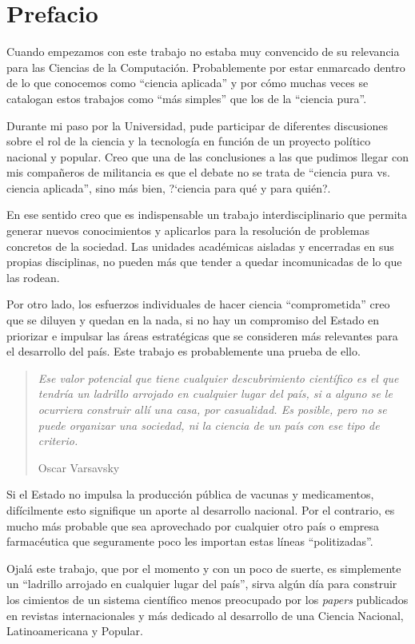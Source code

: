\chapter*{Prefacio}

Cuando empezamos con este trabajo no estaba muy convencido de su relevancia
para las Ciencias de la Computaci\'on. Probablemente por estar enmarcado dentro
de lo que conocemos como ``ciencia aplicada'' y por c\'omo muchas veces se
catalogan estos trabajos como ``m\'as simples'' que los de la ``ciencia pura''.

Durante mi paso por la Universidad, pude participar de diferentes discusiones
sobre el rol de la ciencia y la tecnolog\'ia en funci\'on de un proyecto
pol\'itico nacional y popular. Creo que una de las conclusiones a las que
pudimos llegar con mis compa\~neros de militancia es que el debate no se trata
de ``ciencia pura vs. ciencia aplicada'', sino m\'as bien, ?`ciencia para qu\'e
y para qui\'en?.

En ese sentido creo que es indispensable un trabajo interdisciplinario que
permita generar nuevos conocimientos y aplicarlos para la resoluci\'on de
problemas concretos de la sociedad. Las unidades acad\'emicas aisladas y
encerradas en sus propias disciplinas, no pueden m\'as que tender a quedar
incomunicadas de lo que las rodean.

Por otro lado, los esfuerzos individuales de hacer ciencia ``comprometida''
creo que se diluyen y quedan en la nada, si no hay un compromiso del Estado en
priorizar e impulsar las \'areas estrat\'egicas que se consideren m\'as
relevantes para el desarrollo del pa\'is. Este trabajo es probablemente una
prueba de ello.

\begin{quotation}
 \em Ese valor potencial que tiene cualquier descubrimiento cient\'ifico es el
que tendr\'ia un ladrillo arrojado en cualquier lugar del pa\'is, si a alguno se
le ocurriera construir all\'i una casa, por casualidad. Es posible, pero no se
puede organizar una sociedad, ni la ciencia de un pa\'is con ese tipo de
criterio.
\begin{flushright}
Oscar Varsavsky
\end{flushright}
\end{quotation}

Si el Estado no impulsa la producci\'on p\'ublica de vacunas y medicamentos,
dif\'icilmente esto signifique un aporte al desarrollo nacional. Por el
contrario, es mucho m\'as probable que sea aprovechado por cualquier otro pa\'is
o empresa farmac\'eutica que seguramente poco les importan estas l\'ineas
``politizadas''.

Ojal\'a este trabajo, que por el momento y con un poco de suerte, es simplemente
un ``ladrillo arrojado en cualquier lugar del pa\'is'', sirva alg\'un d\'ia para
construir los cimientos de un sistema cient\'ifico menos preocupado por los
\textit{papers} publicados en revistas internacionales y m\'as dedicado al
desarrollo de una Ciencia Nacional, Latinoamericana y Popular.
